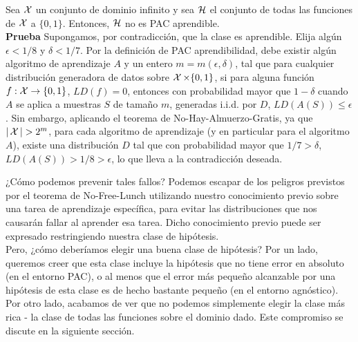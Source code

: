 \begin{cor}
Sea $\mathop{\mbox{$\mathcal{X}$}}\nolimits$ un conjunto de dominio infinito y sea $\mathop{\mbox{$\mathcal{H}$}}\nolimits$ el conjunto de todas las funciones de $\mathop{\mbox{$\mathcal{X}$}}\nolimits$ a $\{0, 1\}$. Entonces, $\mathop{\mbox{$\mathcal{H}$}}\nolimits$ no es PAC aprendible.\\

\textbf{Prueba}
Supongamos, por contradicción, que la clase es aprendible. Elija algún $\epsilon < 1/8$ y $\delta < 1/7$. Por la definición de PAC aprendibilidad, debe existir algún algoritmo de aprendizaje $A$ y un entero $m = m(\epsilon, \delta)$, tal que para cualquier distribución generadora de datos sobre $\mathop{\mbox{$\mathcal{X}$}}\nolimits \times \{0, 1\}$, si para alguna función $f : \mathop{\mbox{$\mathcal{X}$}}\nolimits \rightarrow \{0, 1\}$, $LD(f) = 0$, entonces con probabilidad mayor que $1 - \delta$ cuando $A$ se aplica a muestras $S$ de tamaño $m$, generadas i.i.d. por $D$, $LD(A(S)) \leq \epsilon$. Sin embargo, aplicando el teorema de No-Hay-Almuerzo-Gratis, ya que $|\mathop{\mbox{$\mathcal{X}$}}\nolimits| > 2^m$, para cada algoritmo de aprendizaje (y en particular para el algoritmo $A$), existe una distribución $D$ tal que con probabilidad mayor que $1/7 > \delta$, $LD(A(S)) > 1/8 > \epsilon$, lo que lleva a la contradicción deseada.
\end{cor}
¿Cómo podemos prevenir tales fallos? Podemos escapar de los peligros previstos por el teorema de No-Free-Lunch utilizando nuestro conocimiento previo sobre una tarea de aprendizaje específica, para evitar las distribuciones que nos causarán fallar al aprender esa tarea.
Dicho conocimiento previo puede ser expresado restringiendo nuestra clase de hipótesis.\\

Pero, ¿cómo deberíamos elegir una buena clase de hipótesis? Por un lado, queremos creer que esta clase incluye la hipótesis que no tiene error en absoluto (en el entorno PAC), o al menos que el error más pequeño alcanzable por una hipótesis de esta clase es de hecho bastante pequeño (en el entorno agnóstico). Por otro lado, acabamos de ver que no podemos simplemente elegir la clase más rica - la clase de todas las funciones sobre el dominio dado. Este compromiso se discute en la siguiente sección.

